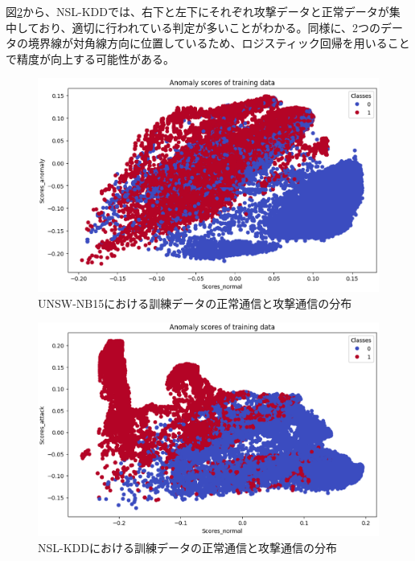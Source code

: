 \documentclass{css}
\begin{document}
図\ref{fig:NSL-KDD1}から、NSL-KDDでは、右下と左下にそれぞれ攻撃データと正常データが集中しており、適切に行われている判定が多いことがわかる。同様に、2つのデータの境界線が対角線方向に位置しているため、ロジスティック回帰を用いることで精度が向上する可能性がある。

\begin{figure}[ht]
    \centering
    \includegraphics[width=\linewidth]{pictures/eps/UNSW-NB151.eps}
    \caption{UNSW-NB15における訓練データの正常通信と攻撃通信の分布}
    \label{fig:UNSW-NB151}
\end{figure}

\begin{figure}[ht]
    \centering
    \includegraphics[width=\linewidth]{pictures/eps/NSL-KDD1.eps}
    \caption{NSL-KDDにおける訓練データの正常通信と攻撃通信の分布}
    \label{fig:NSL-KDD1}
\end{figure}
\end{document}
